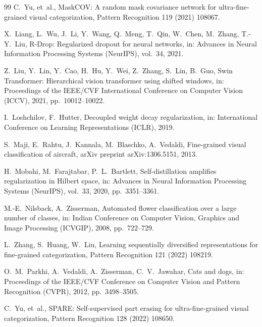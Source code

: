 \documentclass[review,12pt,authoryear]{elsarticle}
\begin{document}
\begin{thebibliography}{99}
C.~Yu, et~al.,
MaskCOV: A random mask covariance network for ultra-fine-grained visual categorization,
Pattern Recognition 119 (2021) 108067.

X.~Liang, L.~Wu, J.~Li, Y.~Wang, Q.~Meng, T.~Qin, W.~Chen, M.~Zhang, T.-Y.~Liu,
R-Drop: Regularized dropout for neural networks,
in: Advances in Neural Information Processing Systems (NeurIPS), vol.~34, 2021.

Z.~Liu, Y.~Lin, Y.~Cao, H.~Hu, Y.~Wei, Z.~Zhang, S.~Lin, B.~Guo,
Swin Transformer: Hierarchical vision transformer using shifted windows,
in: Proceedings of the IEEE/CVF International Conference on Computer Vision (ICCV), 2021, pp.~10012--10022.

I.~Loshchilov, F.~Hutter,
Decoupled weight decay regularization,
in: International Conference on Learning Representations (ICLR), 2019.

S.~Maji, E.~Rahtu, J.~Kannala, M.~Blaschko, A.~Vedaldi,
Fine-grained visual classification of aircraft,
arXiv preprint arXiv:1306.5151, 2013.

H.~Mobahi, M.~Farajtabar, P.~L.~Bartlett,
Self-distillation amplifies regularization in Hilbert space,
in: Advances in Neural Information Processing Systems (NeurIPS), vol.~33, 2020, pp.~3351--3361.

M.-E.~Nilsback, A.~Zisserman,
Automated flower classification over a large number of classes,
in: Indian Conference on Computer Vision, Graphics and Image Processing (ICVGIP), 2008, pp.~722--729.

L.~Zhang, S.~Huang, W.~Liu,
Learning sequentially diversified representations for fine-grained categorization,
Pattern Recognition 121 (2022) 108219.

O.~M.~Parkhi, A.~Vedaldi, A.~Zisserman, C.~V.~Jawahar,
Cats and dogs,
in: Proceedings of the IEEE/CVF Conference on Computer Vision and Pattern Recognition (CVPR), 2012, pp.~3498--3505.

C.~Yu, et~al.,
SPARE: Self-supervised part erasing for ultra-fine-grained visual categorization,
Pattern Recognition 128 (2022) 108650.


\end{thebibliography}
\end{document}
